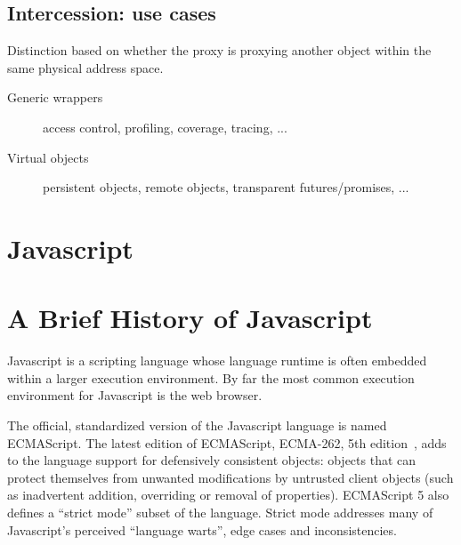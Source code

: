 \documentclass{acm_proc_article-sp}
\begin{document}

\subsection{Intercession: use cases}
\label{sub:use_cases}

Distinction based on whether the proxy is proxying another object within the same physical address space.

\begin{description}
  \item[Generic wrappers] access control, profiling, coverage, tracing, ...
  \item[Virtual objects] persistent objects, remote objects, transparent futures/promises, ...
\end{description}

\section{Javascript}

\section{A Brief History of Javascript}

Javascript is a scripting language whose language runtime is often embedded within a larger execution environment. By far the most common execution environment for Javascript is the web browser.

The official, standardized version of the Javascript language is named ECMAScript. The latest edition of ECMAScript, ECMA-262, 5th edition~\cite{ECMA262}, adds to the language support for defensively consistent objects: objects that can protect themselves from unwanted modifications by untrusted client objects (such as inadvertent addition, overriding or removal of properties). ECMAScript 5 also defines a ``strict mode'' subset of the language. Strict mode addresses many of Javascript's perceived ``language warts'', edge cases and inconsistencies.
\end{document}
